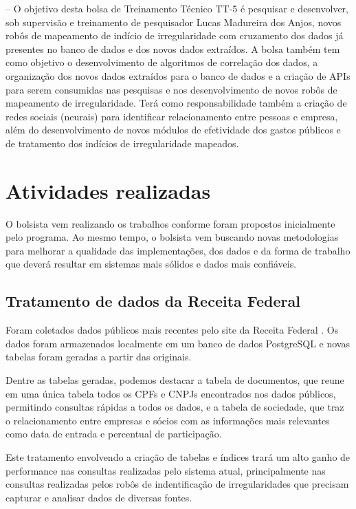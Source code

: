 \documentclass[12pt]{report}
\newcommand{\responsavel}{Lucas Madureira dos Anjos}
\begin{document}
-- O objetivo desta bolsa de Treinamento Técnico TT-5 é pesquisar e desenvolver, sob supervisão e treinamento de pesquisador \responsavel , novos robôs de mapeamento de indício de irregularidade com cruzamento dos dados já presentes no banco de dados e dos novos dados extraídos. A bolsa também tem como objetivo o desenvolvimento de algoritmos de correlação dos dados, a organização dos novos dados extraídos para o banco de dados e a criação de APIs para serem consumidas nas pesquisas e nos desenvolvimento de novos robôs de mapeamento de irregularidade. Terá como responsabilidade também a criação de redes sociais (neurais) para identificar relacionamento entre pessoas e empresa, além do desenvolvimento de novos módulos de efetividade dos gastos públicos e de tratamento dos indícios de irregularidade mapeados.

\chapter{Atividades realizadas}
\label{chp:realizacoes}
O bolsista vem realizando os trabalhos conforme foram propostos inicialmente pelo programa. Ao mesmo tempo, o bolsista vem buscando novas metodologias para melhorar a qualidade das implementações, dos dados e da forma de trabalho que deverá resultar em sistemas mais sólidos e dados mais confiáveis.

\section{Tratamento de dados da Receita Federal}
Foram coletados dados públicos mais recentes pelo site da Receita Federal \cite{receita}. Os dados foram armazenados localmente em um banco de dados PostgreSQL \cite{postgresql} e novas tabelas foram geradas a partir das originais.

Dentre as tabelas geradas, podemos destacar a tabela de documentos, que reune em uma única tabela todos os CPFs e CNPJs encontrados nos dados públicos, permitindo consultas rápidas a todos os dados, e a tabela de sociedade, que traz o relacionamento entre empresas e sócios com as informações mais relevantes como data de entrada e percentual de participação.

Este tratamento envolvendo a criação de tabelas e índices trará um alto ganho de performance nas consultas realizadas pelo sistema atual, principalmente nas consultas realizadas pelos robôs de indentificação de irregularidades que precisam capturar e analisar dados de diversas fontes.
\end{document}
